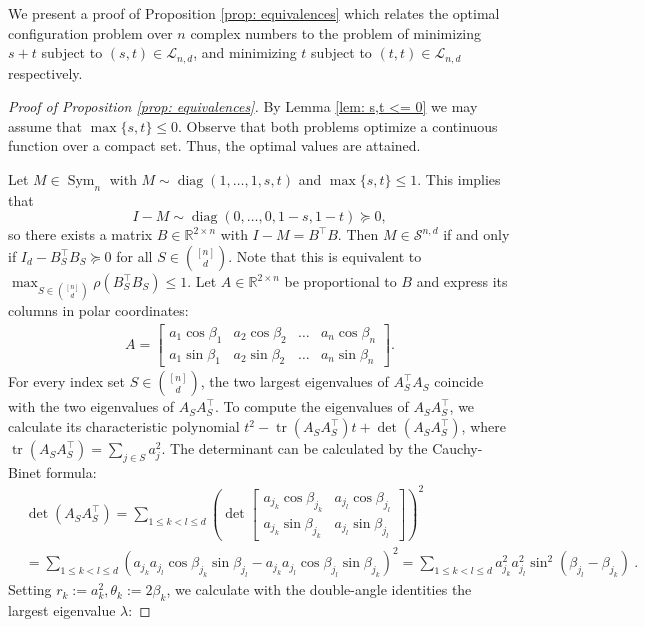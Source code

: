 \documentclass[reqno,hidelinks,11pt]{amsart}
\numberwithin{equation}{section}
\def\RR{\mathbb{R}}
\def\b{\beta}
\def\diag{\operatorname{diag}}
\def\S{\mathcal{S}}
\def\Sym{\operatorname{Sym}}
\def\tr{\operatorname{tr}}
\begin{document}
We present a proof of Proposition \ref{prop: equivalences} which relates the optimal configuration problem over $n$ complex numbers to the problem of minimizing $s+t$ subject to $(s,t) \in \mathcal{L}_{n,d}$, and minimizing $t$ subject to $(t,t) \in \mathcal{L}_{n,d}$ respectively.  
\begin{proof}[Proof of Proposition \ref{prop: equivalences}]
By Lemma \ref{lem: s,t <= 0} we may assume that $\max \{s,t\} \leq 0$.
Observe that both problems optimize a continuous function over a compact set. Thus, the optimal values are attained.

Let $M \in \Sym_n$ with $M \sim \diag (1,\ldots,1,s,t)$ and $\max\{s,t\} \leq 1$. This implies that 
\[
I-M \sim \diag(0,\ldots,0,1-s,1-t) \succeq 0,
\]
so there exists a matrix $B \in \RR^{2 \times n}$ with $I-M=B^\top B$. Then $M \in \S^{n,d}$ if and only if $I_d-B_S^\top B_S \succeq 0$ for all $S \in \binom{[n]}{d}$. Note that this is equivalent to $\max_{S \in \binom{[n]}{d}} \rho(B_S^\top B_S) \leq 1$.
Let $A \in \RR^{2 \times n}$ be proportional to $B$ and express its columns in polar coordinates: 
\begin{align}\label{eq: matrix A}
A=\begin{bmatrix}
a_1\cos\b_1 & a_2\cos\b_2 & \dots & a_n\cos\b_n\\
a_1\sin\b_1 & a_2\sin\b_2 & \dots & a_n\sin\b_n
\end{bmatrix}.
\end{align}
For every index set $S \in \binom{[n]}{d}$, the two largest eigenvalues of $A_S^\top A_S$ coincide with the two eigenvalues of $A_SA_S^\top$. 
To compute the eigenvalues of $A_SA_S^\top$, we calculate its characteristic polynomial $t^2-\tr(A_SA_S^\top)t+\det(A_SA_S^\top)$, where $\tr(A_SA_S^\top)=\sum_{j \in S}a_j^2$. The determinant can be calculated by the Cauchy-Binet formula:
\begin{align*}
&\det(A_SA_S^\top) = \sum_{1 \leq k < l \leq d} \left(\det\begin{bmatrix}
    a_{j_k} \cos\beta_{j_k} & a_{j_l} \cos\beta_{j_l} \\ a_{j_k} \sin\beta_{j_k} & a_{j_l} \sin\beta_{j_l}
\end{bmatrix} \right)^2 \\ 
&= \sum_{1 \leq k < l \leq d}\left( a_{j_k}a_{j_l}\cos\beta_{j_k}\sin\beta_{j_l}-a_{j_k}a_{j_l}\cos\beta_{j_l}\sin\beta_{j_k}\right)^2 =\sum_{1 \leq k < l \leq d} a_{j_k}^2a_{j_l}^2\sin^2(\beta_{j_l}-\beta_{j_k})~.    
\end{align*} 
Setting $r_k:=a_k^2, \theta_k:=2\b_k$, we calculate with the double-angle identities the largest eigenvalue $\lambda$:

\end{proof}
\end{document}
